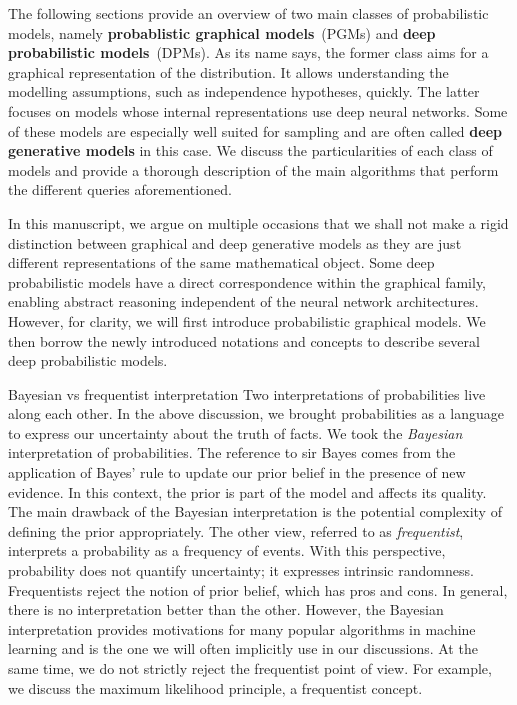The following sections provide an overview of two main classes of probabilistic models, namely \textbf{probablistic graphical models}~(PGMs) and \textbf{deep probabilistic models}~(DPMs). As its name says, the former class aims for a graphical representation of the distribution. It allows understanding the modelling assumptions, such as independence hypotheses, quickly. The latter focuses on models whose internal representations use deep neural networks. Some of these models are especially well suited for sampling and are often called \textbf{deep generative models} in this case. We discuss the particularities of each class of models and provide a thorough description of the main algorithms that perform the different queries aforementioned.

In this manuscript, we argue on multiple occasions that we shall not make a rigid distinction between graphical and deep generative models as they are just different representations of the same mathematical object. Some deep probabilistic models have a direct correspondence within the graphical family, enabling abstract reasoning independent of the neural network architectures. However, for clarity, we will first introduce probabilistic graphical models. We then borrow the newly introduced notations and concepts to describe several deep probabilistic models.


\begin{side_note}{Bayesian vs frequentist interpretation}
  Two interpretations of probabilities live along each other. In the above discussion, we brought probabilities as a language to express our uncertainty about the truth of facts. We took the \textit{Bayesian} interpretation of probabilities. The reference to sir Bayes comes from the application of Bayes' rule to update our prior belief in the presence of new evidence. In this context, the prior is part of the model and affects its quality. The main drawback of the Bayesian interpretation is the potential complexity of defining the prior appropriately. The other view, referred to as \textit{frequentist}, interprets a probability as a frequency of events. With this perspective, probability does not quantify uncertainty; it expresses intrinsic randomness. Frequentists reject the notion of prior belief, which has pros and cons. In general, there is no interpretation better than the other. However, the Bayesian interpretation provides motivations for many popular algorithms in machine learning and is the one we will often implicitly use in our discussions. At the same time, we do not strictly reject the frequentist point of view. For example, we discuss the maximum likelihood principle, a frequentist concept.
\end{side_note}
%

